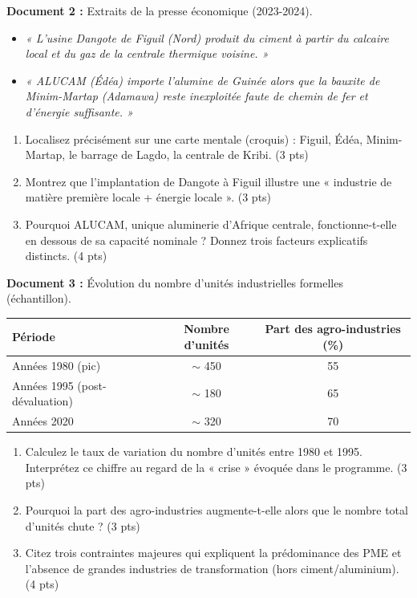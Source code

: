 \documentclass[11pt]{article}
\begin{document}
\begin{exercice}
\textbf{Document 2 :} Extraits de la presse économique (2023-2024).\\
\begin{itemize}
\item \textit{« L'usine Dangote de Figuil (Nord) produit du ciment à partir du calcaire local et du gaz de la centrale thermique voisine. »}
\item \textit{« ALUCAM (Édéa) importe l'alumine de Guinée alors que la bauxite de Minim-Martap (Adamawa) reste inexploitée faute de chemin de fer et d'énergie suffisante. »}
\end{itemize}
\begin{enumerate}
\item Localisez précisément sur une carte mentale (croquis) : Figuil, Édéa, Minim-Martap, le barrage de Lagdo, la centrale de Kribi. \hfill (3 pts)
\item Montrez que l'implantation de Dangote à Figuil illustre une « industrie de matière première locale + énergie locale ». \hfill (3 pts)
\item Pourquoi ALUCAM, unique aluminerie d'Afrique centrale, fonctionne-t-elle en dessous de sa capacité nominale ? Donnez trois facteurs explicatifs distincts. \hfill (4 pts)
\end{enumerate}
\end{exercice}

\begin{exercice}
\textbf{Document 3 :} Évolution du nombre d'unités industrielles formelles (échantillon).\\
\begin{tabular}{lcc}
\toprule
Période & Nombre d'unités & Part des agro-industries (\%)\\
\midrule
Années 1980 (pic) & $\sim$ 450 & 55\\
Années 1995 (post-dévaluation) & $\sim$ 180 & 65\\
Années 2020 & $\sim$ 320 & 70\\
\bottomrule
\end{tabular}
\begin{enumerate}
\item Calculez le taux de variation du nombre d'unités entre 1980 et 1995. Interprétez ce chiffre au regard de la « crise » évoquée dans le programme. \hfill (3 pts)
\item Pourquoi la part des agro-industries augmente-t-elle alors que le nombre total d'unités chute ? \hfill (3 pts)
\item Citez trois contraintes majeures qui expliquent la prédominance des PME et l'absence de grandes industries de transformation (hors ciment/aluminium). \hfill (4 pts)
\end{enumerate}
\end{exercice}
\end{document}
